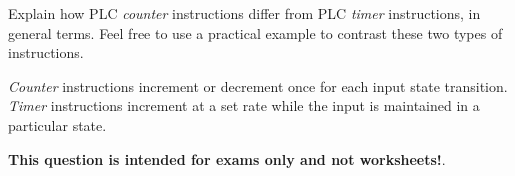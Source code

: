 

Explain how PLC {\it counter} instructions differ from PLC {\it timer} instructions, in general terms.  Feel free to use a practical example to contrast these two types of instructions.







{\it Counter} instructions increment or decrement once for each input state transition.  {\it Timer} instructions increment at a set rate while the input is maintained in a particular state.







{\bf This question is intended for exams only and not worksheets!}.



